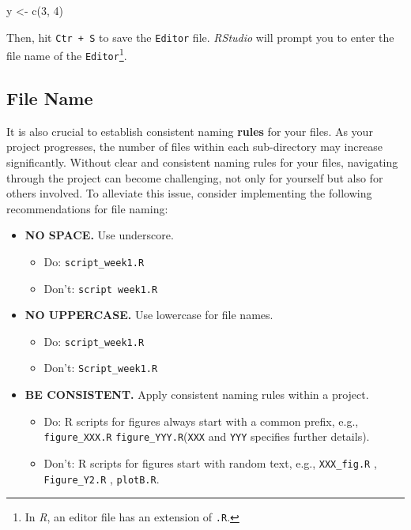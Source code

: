 \documentclass[
]{book}
\newenvironment{Shaded}{\begin{snugshade}}{\end{snugshade}}
\newcommand{\DecValTok}[1]{\textcolor[rgb]{0.00,0.00,0.81}{#1}}
\newcommand{\FunctionTok}[1]{\textcolor[rgb]{0.00,0.00,0.00}{#1}}
\newcommand{\NormalTok}[1]{#1}
\newcommand{\OtherTok}[1]{\textcolor[rgb]{0.56,0.35,0.01}{#1}}
\providecommand{\tightlist}{%
  \setlength{\itemsep}{0pt}\setlength{\parskip}{0pt}}
\begin{document}
\begin{Shaded}
\begin{Highlighting}[]
\NormalTok{y }\OtherTok{\textless{}{-}} \FunctionTok{c}\NormalTok{(}\DecValTok{3}\NormalTok{, }\DecValTok{4}\NormalTok{)}
\end{Highlighting}
\end{Shaded}

Then, hit \texttt{Ctr\ +\ S} to save the \texttt{Editor} file. \emph{RStudio} will prompt you to enter the file name of the \texttt{Editor}\footnote{In \emph{R}, an editor file has an extension of \texttt{.R}.}.

\hypertarget{file-name}{%
\subsection{File Name}\label{file-name}}

It is also crucial to establish consistent naming \textbf{rules} for your files. As your project progresses, the number of files within each sub-directory may increase significantly. Without clear and consistent naming rules for your files, navigating through the project can become challenging, not only for yourself but also for others involved. To alleviate this issue, consider implementing the following recommendations for file naming:

\begin{itemize}
\tightlist
\item
  \textbf{NO SPACE.} Use underscore.

  \begin{itemize}
  \tightlist
  \item
    Do: \texttt{script\_week1.R}
  \item
    Don't: \texttt{script\ week1.R}
  \end{itemize}
\item
  \textbf{NO UPPERCASE.} Use lowercase for file names.

  \begin{itemize}
  \tightlist
  \item
    Do: \texttt{script\_week1.R}
  \item
    Don't: \texttt{Script\_week1.R}
  \end{itemize}
\item
  \textbf{BE CONSISTENT.} Apply consistent naming rules within a project.

  \begin{itemize}
  \tightlist
  \item
    Do: R scripts for figures always start with a common prefix, e.g., \texttt{figure\_XXX.R} \texttt{figure\_YYY.R}(\texttt{XXX} and \texttt{YYY} specifies further details).
  \item
    Don't: R scripts for figures start with random text, e.g., \texttt{XXX\_fig.R} , \texttt{Figure\_Y2.R} , \texttt{plotB.R}.
  \end{itemize}
\end{itemize}
\end{document}
